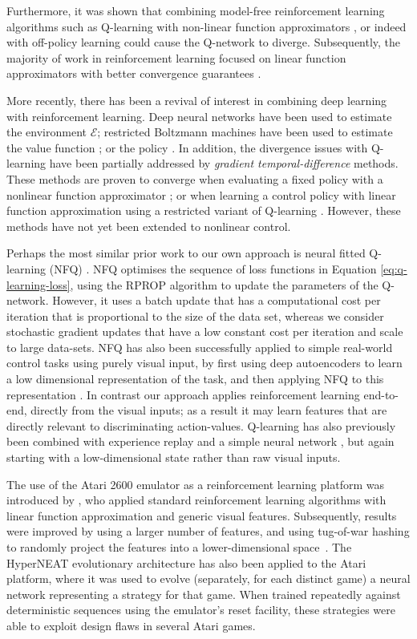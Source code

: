 Furthermore, it was shown that combining model-free reinforcement learning algorithms such as Q-learning with non-linear function approximators \cite{tsitsiklis:td-convergence}, or indeed with off-policy learning \cite{baird:residual} could cause the Q-network to diverge. Subsequently, the majority of work in reinforcement learning focused on linear function approximators with better convergence guarantees \cite{tsitsiklis:td-convergence}.

More recently, there has been a revival of interest in combining deep learning with reinforcement learning. Deep neural networks have been used to estimate the environment $\mathcal{E}$; restricted Boltzmann machines have been used to estimate the value function \cite{sallans:rbm}; or the policy \cite{heess:energy-based}. In addition, the divergence issues with Q-learning have been partially addressed by \emph{gradient temporal-difference} methods. These methods are proven to converge when evaluating a fixed policy with a nonlinear function approximator \cite{maei:nonlinear}; or when learning a control policy with linear function approximation using a restricted variant of Q-learning \cite{maei:gq}. However, these methods have not yet been extended to nonlinear control.

Perhaps the most similar prior work to our own approach is neural fitted Q-learning (NFQ) \cite{riedmiller-nfq}. NFQ optimises the sequence of loss functions in Equation \ref{eq:q-learning-loss}, using the RPROP algorithm to update the parameters of the Q-network. However, it uses a batch update that has a computational cost per iteration that is proportional to the size of the data set, whereas we consider stochastic gradient updates that have a low constant cost per iteration and scale to large data-sets. NFQ has also been successfully applied to simple real-world control tasks using purely visual input, by first using deep autoencoders to learn a low dimensional representation of the task, and then applying NFQ to this representation \cite{lange:dfq}. In contrast our approach applies reinforcement learning end-to-end, directly from the visual inputs; as a result it may learn features that are directly relevant to discriminating action-values.  Q-learning has also previously been combined with experience replay and a simple neural network \cite{lin1993reinforcement}, but again starting with a low-dimensional state rather than raw visual inputs.

The use of the Atari 2600 emulator as a reinforcement learning platform was introduced by \cite{bellemare-ale}, who applied standard reinforcement learning algorithms with linear function approximation and generic visual features. Subsequently, results were improved by using a larger number of features, and using tug-of-war hashing to randomly project the features into a lower-dimensional space~\cite{bellemare2012sketch}. The HyperNEAT evolutionary architecture \cite{hausknecht-neuro} has also been applied to the Atari platform, where it was used to evolve (separately, for each distinct game) a neural network representing a strategy for that game. When trained repeatedly against deterministic sequences using the emulator's reset facility, these strategies were able to exploit design flaws in several Atari games. 

